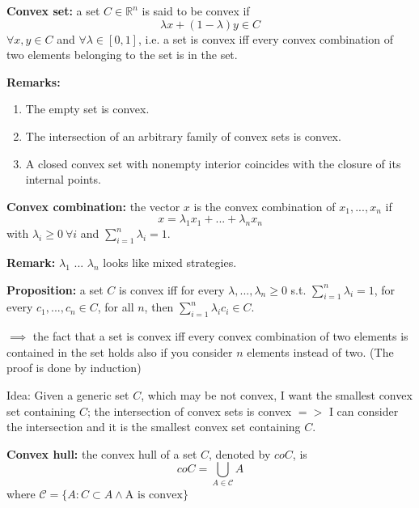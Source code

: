 
%


\bigskip
\noindent \textbf{Convex set:} a set $C \in \mathbb{R}^n$ is said to be convex 
if
\[
	\lambda x + (1 - \lambda)y \in C
\]
$\forall x,y \in C$ and $\forall \lambda \in [0,1]$, i.e. a set is convex iff 
every convex combination of two elements belonging to the set is in the set.

\noindent \textbf{Remarks:}
\begin{enumerate}
	\item The empty set is convex.
	\item The intersection of an arbitrary family of convex sets is convex.
	\item A closed convex set with nonempty interior coincides with the closure 
	of its internal points.
\end{enumerate}

\bigskip
\noindent \textbf{Convex combination:} the vector $x$ is the convex combination 
of $x_1,...,x_n$ if 
\[x = \lambda_1x_1 + ... + \lambda_nx_n\]
with $\lambda_i \geq 0 ~\forall i$ and $\sum_{i=1}^n{\lambda_i} = 1$.

\noindent \textbf{Remark:} $\lambda_1$ ... $\lambda_n$ looks like mixed 
strategies.

\bigskip
\noindent \textbf{Proposition:} a set $C$ is convex iff for every $\lambda,...,
\lambda_n \geq 0$ s.t. $\sum_{i=1}^n{\lambda_i} = 1$, for every $c_1,...,c_n 
\in C$, for all $n$, then $\sum_{i=1}^n{\lambda_ic_i} \in C$.

\noindent $\implies$ the fact that a set is convex iff every convex combination 
of two elements is contained in the set holds also if you consider $n$ elements 
instead of two. (The proof is done by induction)

\bigskip
\noindent Idea: Given a generic set $C$, which may be not convex, I want the 
smallest convex set containing $C$; the intersection
of convex sets is convex $=>$ I can consider the intersection
and it is the smallest convex set containing $C$.

\bigskip
\noindent \textbf{Convex hull:} the convex hull of a set $C$, denoted by $coC$, 
is
\[
	coC = \bigcup_{A \in \mathcal{C}}A
\]
where $\mathcal{C} = \{A: C \subset A \wedge \text{A is convex}\}$


